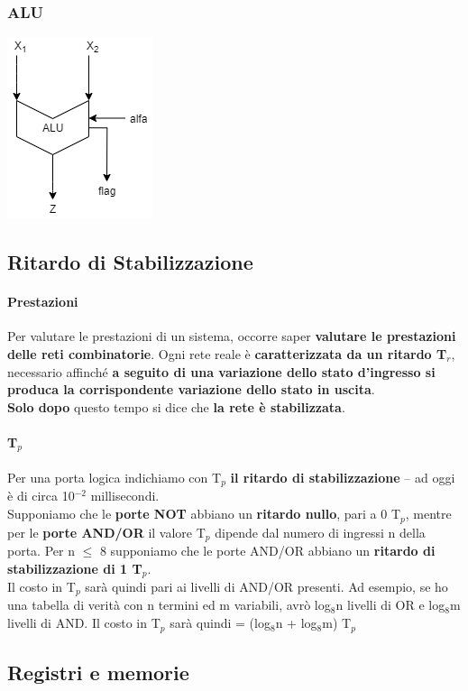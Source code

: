 \documentclass[10pt]{report}
\begin{document}
\subsubsection{ALU}
	\includegraphics[scale=0.7]{ALU.png}
\subsection{Ritardo di Stabilizzazione}
\paragraph{Prestazioni} Per valutare le prestazioni di un sistema, occorre saper \textbf{valutare le prestazioni delle reti combinatorie}. Ogni rete reale è \textbf{caratterizzata da un ritardo T$_r$}, necessario affinché \textbf{a seguito di una variazione dello stato d'ingresso si produca la corrispondente variazione dello stato in uscita}.\\
\textbf{Solo dopo} questo tempo si dice che \textbf{la rete è stabilizzata}.
\paragraph{T$_p$} Per una porta logica indichiamo con T$_p$ \textbf{il ritardo di stabilizzazione} -- ad oggi è di circa 10$^{-2}$ millisecondi.\\
Supponiamo che le \textbf{porte NOT} abbiano un \textbf{ritardo nullo}, pari a 0 T$_p$, mentre per le \textbf{porte AND/OR} il valore T$_p$ dipende dal numero di ingressi n della porta. Per n $\leq$ 8 supponiamo che le porte AND/OR abbiano un \textbf{ritardo di stabilizzazione di 1 T$_p$}.\\
Il costo in T$_p$ sarà quindi pari ai livelli di AND/OR presenti. Ad esempio, se ho una tabella di verità con n termini ed m variabili, avrò log$_8$n livelli di OR e log$_8$m livelli di AND. Il costo in T$_p$ sarà quindi = (log$_8$n + log$_8$m) T$_p$
\subsection{Registri e memorie}
\pagebreak
\end{document}
